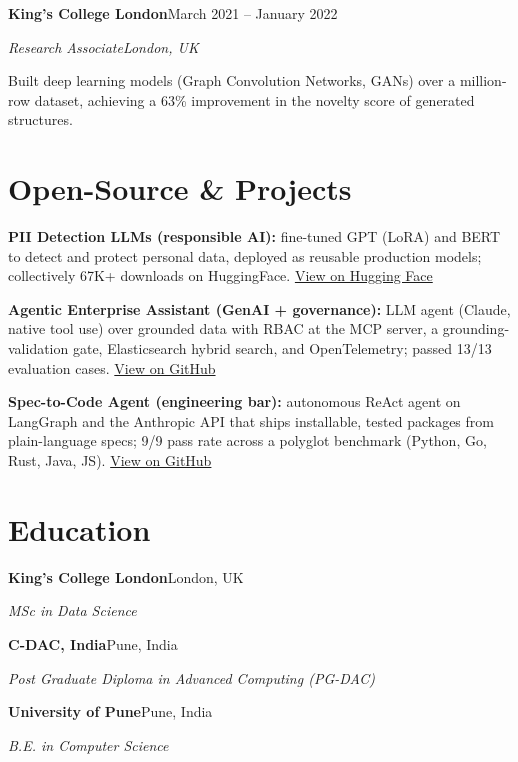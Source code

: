 \documentclass[10pt,a4paper]{article}
\newcommand{\entry}[4]{%
  {\color{company}\bfseries #1}\hfill {\color{muted}#2}\par
  \vspace{1pt}
  {\itshape #3}\hfill {\color{muted}\itshape #4}\par
  \vspace{3pt}%
}
\begin{document}
\entry{King's College London}{March 2021 -- January 2022}{Research Associate}{London, UK}
\begin{tight}
  \item Built deep learning models (Graph Convolution Networks, GANs) over a million-row dataset, achieving a 63\% improvement in the novelty score of generated structures.
\end{tight}

\section{Open-Source \& Projects}
\begin{tight}
  \item \textbf{PII Detection LLMs (responsible AI):} fine-tuned GPT (LoRA) and BERT to detect and protect personal data, deployed as reusable production models; collectively 67K+ downloads on HuggingFace. \href{https://huggingface.co/ab-ai/pii_model}{View on Hugging Face}
  \item \textbf{Agentic Enterprise Assistant (GenAI + governance):} LLM agent (Claude, native tool use) over grounded data with RBAC at the MCP server, a grounding-validation gate, Elasticsearch hybrid search, and OpenTelemetry; passed 13/13 evaluation cases. \href{https://github.com/abhijeetscode/Agentic-Enterprise-Assistant}{View on GitHub}
  \item \textbf{Spec-to-Code Agent (engineering bar):} autonomous ReAct agent on LangGraph and the Anthropic API that ships installable, tested packages from plain-language specs; 9/9 pass rate across a polyglot benchmark (Python, Go, Rust, Java, JS). \href{https://github.com/abhijeetscode/Spec-to-Code-Agent}{View on GitHub}
\end{tight}

\section{Education}
{\color{company}\bfseries King's College London}\hfill {\color{muted}London, UK}\par
{\itshape MSc in Data Science}\par\vspace{2pt}
{\color{company}\bfseries C-DAC, India}\hfill {\color{muted}Pune, India}\par
{\itshape Post Graduate Diploma in Advanced Computing (PG-DAC)}\par\vspace{2pt}
{\color{company}\bfseries University of Pune}\hfill {\color{muted}Pune, India}\par
{\itshape B.E. in Computer Science}\par
\end{document}
